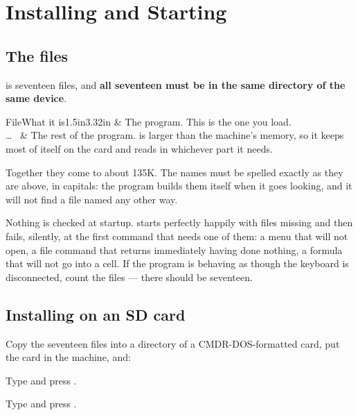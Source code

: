 \chapter{Installing and Starting}
\label{ch:installing}

\section{The files}

\ccprod{} is seventeen files, and \textbf{all seventeen must be in the same
directory of the same device}.

\begin{cctable}{File}{What it is}{1.5in}{3.32in}
 & The program. This is the one you load. \\
 \dots\  & The rest of the program. \ccprod{}
is larger than the machine's memory, so it keeps most of itself on the card and
reads in whichever part it needs. \\
\end{cctable}

Together they come to about 135K. The names must be spelled exactly as they are
above, in capitals: the program builds them itself when it goes looking, and it
will not find a file named any other way.

\begin{cccaution}
Nothing is checked at startup. \ccprod{} starts perfectly happily with files
missing and then fails, silently, at the first command that needs one of them: a
menu that will not open, a file command that returns immediately having done
nothing, a formula that will not go into a cell. If the program is behaving as
though the keyboard is disconnected, count the files --- there should be
seventeen.
\end{cccaution}

\section{Installing on an SD card}

Copy the seventeen files into a directory of a CMDR-DOS-formatted card, put the
card in the machine, and:

\begin{ccprocedure}
\item Type  and press .
\item Type  and press .
\end{ccprocedure}

